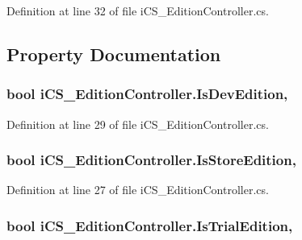 Definition at line 32 of file i\+C\+S\+\_\+\+Edition\+Controller.\+cs.



\subsection{Property Documentation}
\hypertarget{classi_c_s___edition_controller_ae5ce4e3bd30253922ce95997660ec219}{
\subsubsection[{Is\+Dev\+Edition}]{\setlength{\rightskip}{0pt plus 5cm}bool i\+C\+S\+\_\+\+Edition\+Controller.\+Is\+Dev\+Edition\hspace{0.3cm}{\ttfamily [static]}, {\ttfamily [get]}}}\label{classi_c_s___edition_controller_ae5ce4e3bd30253922ce95997660ec219}


Definition at line 29 of file i\+C\+S\+\_\+\+Edition\+Controller.\+cs.

\hypertarget{classi_c_s___edition_controller_abddf73e6a8588f0dca62e882665ad44a}{
\subsubsection[{Is\+Store\+Edition}]{\setlength{\rightskip}{0pt plus 5cm}bool i\+C\+S\+\_\+\+Edition\+Controller.\+Is\+Store\+Edition\hspace{0.3cm}{\ttfamily [static]}, {\ttfamily [get]}}}\label{classi_c_s___edition_controller_abddf73e6a8588f0dca62e882665ad44a}


Definition at line 27 of file i\+C\+S\+\_\+\+Edition\+Controller.\+cs.

\hypertarget{classi_c_s___edition_controller_a9b3d5e2d900ae63ffbe0c7c0df0e9dfc}{
\subsubsection[{Is\+Trial\+Edition}]{\setlength{\rightskip}{0pt plus 5cm}bool i\+C\+S\+\_\+\+Edition\+Controller.\+Is\+Trial\+Edition\hspace{0.3cm}{\ttfamily [static]}, {\ttfamily [get]}}}\label{classi_c_s___edition_controller_a9b3d5e2d900ae63ffbe0c7c0df0e9dfc}


